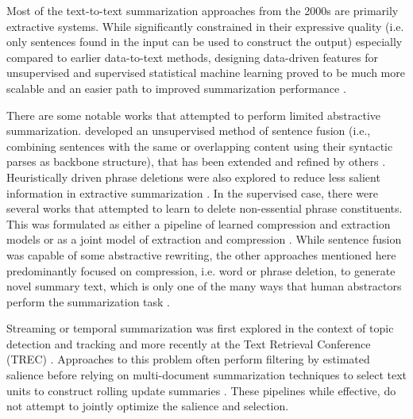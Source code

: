 Most of the text-to-text summarization approaches from the 2000s are primarily
extractive systems.  While significantly constrained in their expressive
quality (i.e. only sentences found in the input can be used to construct the
output) especially compared to earlier data-to-text methods, designing
data-driven features for unsupervised and supervised statistical machine
learning proved to be much more scalable and an easier path to improved
summarization performance \citep{nenkova2011}. 
 
There are some notable works that attempted to perform limited abstractive
summarization. \cite{barzilay2005}  developed an unsupervised method of
sentence fusion (i.e., combining sentences with the same or overlapping content
using their syntactic parses as backbone structure), that has been extended and
refined by others \citep{marsi2005,filippova2008}. Heuristically driven phrase
deletions were also explored to reduce less salient information in extractive
summarization \citep{jing2000,zajic2007}.  In the supervised case, there were
several works that attempted to learn to  delete non-essential phrase
constituents.  This was formulated as either a pipeline of learned compression
and extraction models \citep{wang2013} or as a joint model of extraction and
compression \citep{martins2009,bergkirkpatrick2011}.  While sentence fusion was
capable of some abstractive rewriting, the other approaches mentioned here
predominantly focused on compression, i.e. word or phrase deletion, to generate
novel summary text, which is only one of the many ways that human abstractors
perform the summarization task \citep{jing2000b}.

Streaming or temporal summarization was first explored in the context of topic
detection and tracking \citep{khandelwal2001,allan2001} and more recently at
the Text Retrieval Conference (TREC) \citep{aslam2013}. Approaches to this
problem often perform filtering by estimated salience before relying on
multi-document summarization techniques to select text units to construct
rolling update summaries \citep{guo2013,mccreadie2014}. These pipelines while
effective, do not attempt to jointly optimize the salience and selection.
